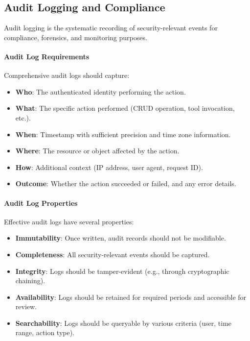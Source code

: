 \documentclass[a4paper,twoside]{sapthesis}
\begin{document}
\subsection{Audit Logging and Compliance}

Audit logging is the systematic recording of security-relevant events for compliance, forensics, and monitoring purposes.

\paragraph{Audit Log Requirements}

Comprehensive audit logs should capture:

\begin{itemize}
    \item \textbf{Who}: The authenticated identity performing the action.
    \item \textbf{What}: The specific action performed (CRUD operation, tool invocation, etc.).
    \item \textbf{When}: Timestamp with sufficient precision and time zone information.
    \item \textbf{Where}: The resource or object affected by the action.
    \item \textbf{How}: Additional context (IP address, user agent, request ID).
    \item \textbf{Outcome}: Whether the action succeeded or failed, and any error details.
\end{itemize}

\paragraph{Audit Log Properties}

Effective audit logs have several properties:

\begin{itemize}
    \item \textbf{Immutability}: Once written, audit records should not be modifiable.
    \item \textbf{Completeness}: All security-relevant events should be captured.
    \item \textbf{Integrity}: Logs should be tamper-evident (e.g., through cryptographic chaining).
    \item \textbf{Availability}: Logs should be retained for required periods and accessible for review.
    \item \textbf{Searchability}: Logs should be queryable by various criteria (user, time range, action type).
\end{itemize}
\end{document}
